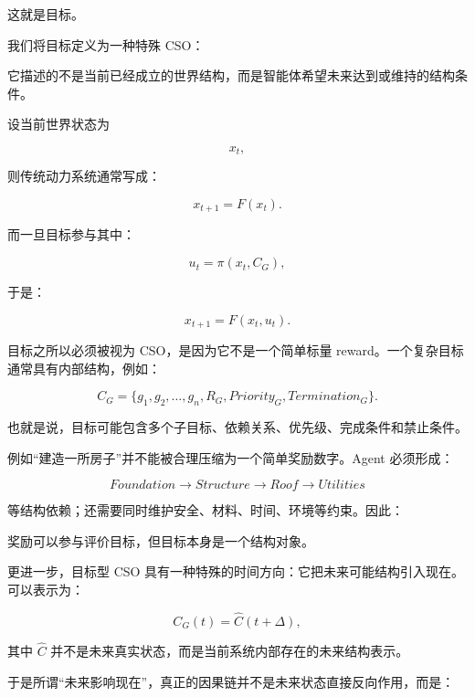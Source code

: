 这就是目标。

我们将目标定义为一种特殊 CSO：

\begin{statementbox}
\centering
{}
\end{statementbox}

它描述的不是当前已经成立的世界结构，而是智能体希望未来达到或维持的结构条件。

设当前世界状态为

\[
x_t,
\]

则传统动力系统通常写成：

\[
x_{t+1}=F(x_t).
\]

而一旦目标参与其中：

\[
u_t
=
\pi(x_t,C_G),
\]

于是：

\[
x_{t+1}
=
F(x_t,u_t).
\]

目标之所以必须被视为 CSO，是因为它不是一个简单标量 reward。一个复杂目标通常具有内部结构，例如：

\[
C_G
=
\{
g_1,
g_2,
\ldots,
g_n,
R_G,
Priority_G,
Termination_G
\}.
\]

也就是说，目标可能包含多个子目标、依赖关系、优先级、完成条件和禁止条件。

例如“建造一所房子”并不能被合理压缩为一个简单奖励数字。Agent 必须形成：

\[
Foundation
\rightarrow
Structure
\rightarrow
Roof
\rightarrow
Utilities
\]

等结构依赖；还需要同时维护安全、材料、时间、环境等约束。因此：

\begin{statementbox}
\centering
{}
\end{statementbox}

奖励可以参与评价目标，但目标本身是一个结构对象。

更进一步，目标型 CSO 具有一种特殊的时间方向：它把未来可能结构引入现在。可以表示为：

\[
C_G(t)
=
\hat C(t+\Delta),
\]

其中 \(\hat C\) 并不是未来真实状态，而是当前系统内部存在的未来结构表示。

于是所谓“未来影响现在”，真正的因果链并不是未来状态直接反向作用，而是：

\begin{statementbox}
\centering
{}
\end{statementbox}


